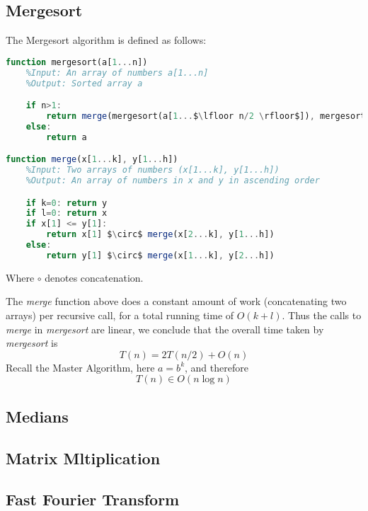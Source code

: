 \subsection{Mergesort}

\begin{definition}[Mergesort]
The Mergesort algorithm is defined as follows:
\begin{lstlisting}[mathescape=true, language=Octave]
function mergesort(a[1...n])
	%Input: An array of numbers a[1...n]
	%Output: Sorted array a

	if n>1:
		return merge(mergesort(a[1...$\lfloor n/2 \rfloor$]), mergesort(a[$\lfloor n/2 \rfloor$+1...n]))
	else:
		return a

function merge(x[1...k], y[1...h])
	%Input: Two arrays of numbers (x[1...k], y[1...h])
	%Output: An array of numbers in x and y in ascending order

	if k=0: return y
	if l=0: return x
	if x[1] <= y[1]:
		return x[1] $\circ$ merge(x[2...k], y[1...h])
	else:
		return y[1] $\circ$ merge(x[1...k], y[2...h])
\end{lstlisting}
Where $\circ$ denotes concatenation.
\end{definition}

The \textit{merge} function above does a constant amount of work (concatenating two arrays) per recursive call, for a total running time of $O(k + l)$. Thus the calls to \textit{merge} in \textit{mergesort} are linear, we conclude that the overall time taken by \textit{mergesort} is
\[
T(n) = 2T(n/2) + O(n)
\]
Recall the Master Algorithm, here $a=b^k$, and therefore
\[
T(n) \in O(n\log n)
\]

\subsection{Medians}

\subsection{Matrix Mltiplication}

\begin{definition}

\end{definition}

\subsection{Fast Fourier Transform}